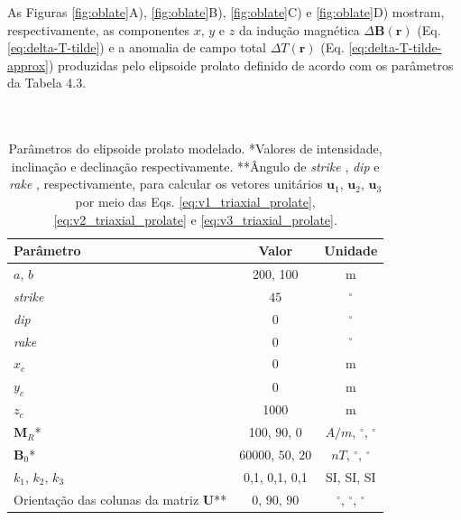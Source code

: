 As Figuras \ref{fig:oblate}A), \ref{fig:oblate}B), \ref{fig:oblate}C) e \ref{fig:oblate}D) mostram, respectivamente, as componentes $x$, $y$ e $z$ da indução magnética $\Delta \mathbf{B}(\mathbf{r})$ (Eq. \ref{eq:delta-T-tilde}) e a
anomalia de campo total $\Delta T (\mathbf{r})$ (Eq. \ref{eq:delta-T-tilde-approx}) produzidas pelo elipsoide prolato definido de acordo com os parâmetros da Tabela 4.3.
\\\\\\

\begin{table}[h!]
	\begin{center}
		\begin{tabular}{|l|c|c|}
			\hline
			\textbf{Parâmetro}  & \textbf{Valor}  & \textbf{Unidade} \\
			\hline 
			$a$, $b$   & 200, 100 & m\\
			\hline
			\textit{strike}   & $45$ & $^{\circ}$\\
			\hline
			\textit{dip}    & $0$ & $^{\circ}$\\
			\hline
			\textit{rake}   & $0$  & $^{\circ}$\\
			\hline
			$x_c$   & 0  & m\\
			\hline          
			$y_c$   & 0  & m\\
			\hline                
			$z_c$   & 1000  & m\\
			\hline
			$\mathbf{M}_{R}$*  & 100, $90$, $0$ & $A/m$, $^{\circ}$, $^{\circ}$\\
			\hline
			$\mathbf{B}_{0}$*    & 60000, $50$, $20$ & $nT$, $^{\circ}$, $^{\circ}$\\
			\hline
			$k_{1}$, $k_{2}$, $k_{3}$   & 0,1, 0,1, 0,1  & SI, SI, SI\\
			\hline
			Orientação das colunas da matriz $\mathbf{U}$**   & $0$, $90$, $90$  & $^{\circ}$, $^{\circ}$, $^{\circ}$\\
			\hline
			
		\end{tabular}
		\caption{Parâmetros do elipsoide prolato modelado. *Valores de intensidade, inclinação e declinação respectivamente. **Ângulo de \textit{strike} , \textit{dip}  e \textit{rake} , respectivamente, para calcular os vetores unitários $\mathbf{u}_{1}$, $\mathbf{u}_{2}$, $\mathbf{u}_{3}$ por meio das Eqs. \ref{eq:v1_triaxial_prolate}, \ref{eq:v2_triaxial_prolate} e \ref{eq:v3_triaxial_prolate}.}
	\end{center}
	\label{tab:prolato}
\end{table}

